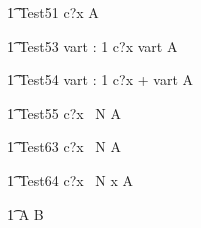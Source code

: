 
\begin{circusaction}
   \t1 Test51 \circdef c?x \then  {} \rcirctime A \\
\end{circusaction}

\begin{circusaction}
   \t1 Test53 \circdef \circvres vart : 1   \circspot c?x \then  \lcirctime vart \rcirctime A \\
\end{circusaction}

\begin{circusaction}
   \t1 Test54 \circdef \circvres vart : 1   \circspot c?x \then  {} + vart \rcirctime A \\
\end{circusaction}



\begin{circusaction}
   \t1 Test55 \circdef c?x \circat~N  \then A \\
\end{circusaction}


 
\begin{circusaction}
    \t1 Test63 \circdef c?x \circat~N  \then {} \rcirctime A \\
\end{circusaction}
 
 

\begin{circusaction}
    \t1 Test64 \circdef c?x \circat~N  \then \lcirctime x \rcirctime A \\
\end{circusaction}


\begin{circusaction}        
        \t1 \circspot A \circseq B\\
\end{circusaction}


\begin{circus}    
\circend
\end{circus}

